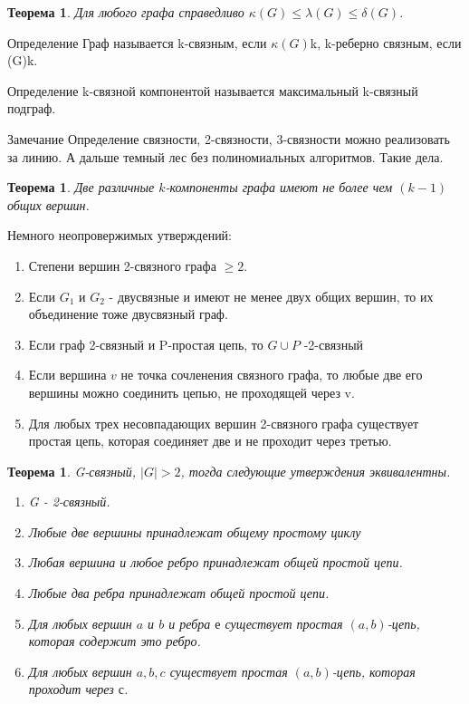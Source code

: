 \documentclass[a4paper,openany]{book}
\newcounter{TheoremCounter}
\newtheorem{theorem}[TheoremCounter]{Теорема}
\newenvironment{definition}
{\begin{statement}{Определение}}
    {\end{statement}}
\newenvironment{note}
{\begin{statementDotted}{Замечание}}
    {\end{statementDotted}}
\begin{document}
\begin{theorem}
  Для любого графа справедливо $\kappa(G) \leqslant \lambda(G) \leqslant \delta(G) $.
\end{theorem}

\begin{definition}
  Граф называется k-связным, если $\kappa(G)$k, k-реберно связным, если (G)k.
\end{definition}

\begin{definition}
  k-связной компонентой называется максимальный k-связный подграф.
\end{definition}

\begin{note}
  Определение связности, 2-связности, 3-связности можно реализовать за линию. А дальше темный лес без полиномиальных алгоритмов. Такие дела.
\end{note}

\begin{theorem}
  Две различные $k$-компоненты графа имеют не более чем $(k-1)$ общих вершин.
\end{theorem}

Немного неопровержимых утверждений:
\begin{enumerate}
  \item Степени вершин 2-связного графа $\geqslant 2$.
  \item Если $G_1$ и $G_2$ - двусвязные и имеют не менее двух общих вершин, то
  их объединение тоже двусвязный граф.
  \item Если граф 2-связный и P-простая цепь, то $G \cup P$ -2-связный
  \item Если вершина $v$ не точка сочленения связного графа, то любые две его
  вершины можно соединить цепью, не проходящей через v.
  \item Для любых трех несовпадающих вершин 2-связного графа существует простая цепь,
  которая соединяет две и не проходит через третью.
\end{enumerate}

\begin{theorem}
  G-связный, $|G| > 2$, тогда следующие утверждения эквивалентны.
  \begin{enumerate}
    \item G - 2-связный.
    \item Любые две вершины принадлежат общему простому циклу
    \item Любая вершина и любое ребро принадлежат общей простой цепи.
    \item Любые два ребра принадлежат общей простой цепи.
    \item Для любых вершин $a$ и $b$ и ребра $е$ существует простая $(a,b)$-цепь, которая содержит это ребро.
    \item Для любых вершин $a,b,c$ существует простая $(a,b)$-цепь, которая проходит через $с$.
  \end{enumerate}
\end{theorem}
\end{document}
